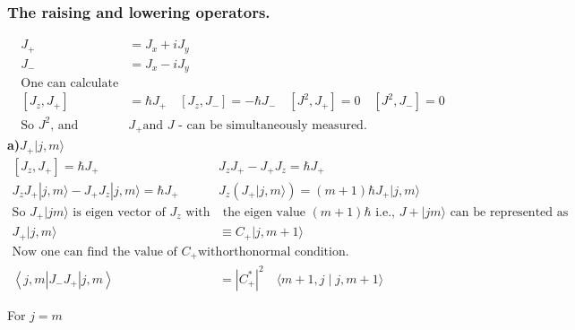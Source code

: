 \subsubsection{The raising and lowering operators.}
\begin{align*}
J_{+}&=J_{x}+i J_{y}\\
J_{-}&=J_{x}-i J_{y}\\
\text{One can calculate}\\
\left[J_{z}, J_{+}\right]&=\hbar J_{+} \quad\left[J_{z}, J_{-}\right]=-\hbar J_{-} \quad\left[J^{2}, J_{+}\right]=0 \quad\left[J^{2}, J_{-}\right]=0\\
\text{So $J^{2}$, and }&\text{$J_{+}$and $J$ - can be simultaneously measured.}
\end{align*}
\textbf{a)\quad$J_{+}|j, m\rangle$}\\
\begin{align*}
{\left[J_{z}, J_{+}\right]=\hbar J_{+}} \hspace{1cm} &J_{z} J_{+}-J_{+} J_{z}=\hbar J_{+} \\
J_{z} J_{+}|j, m\rangle-J_{+} J_{z}|j, m\rangle=\hbar J_{+} \hspace{1cm} &J_{z}\left(J_{+}|j, m\rangle\right)=(m+1) \hbar J_{+}|j, m\rangle\\
\text{So $J_{+}|j m\rangle$ is  eigen vector of $J_{z}$ with }&\text{ the eigen value $(m+1) \hbar$ i.e., $J+|j m\rangle$ can be represented as}\\
J_{+}|j, m\rangle &\equiv C_{+}|j, m+1\rangle\\
\text{Now one can find the value of  $C_{+}$with}&\text{ orthonormal condition.}\\
\left\langle j, m\left|J_{-} J_{+}\right| j, m\right\rangle&=\left|C_{+}^{*}\right|^{2} \quad\langle m+1, j \mid j, m+1\rangle
\end{align*}
\begin{center}
\end{center}
\hspace{4cm}For $j=m$\hspace{1cm}
